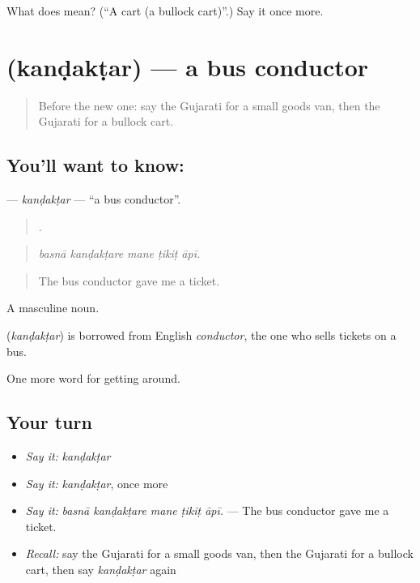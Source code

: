 \begin{tcolorbox}[breakable,colback=teal!4,colframe=teal!35!black,title={Before you move on}]
What does  mean? (\textquotedblleft{}A cart (a bullock cart)\textquotedblright{}.) Say it once more.
\end{tcolorbox}
\section[\texorpdfstring{\gu{કંડક્ટર} (kanḍakṭar)}{કંડક્ટર (kanḍakṭar)}]{ (kanḍakṭar) — a bus conductor}

\label{lesson:GU-C402-kandaktar}



\begin{quote}
Before the new one: say the Gujarati for a small goods van, then the Gujarati for a bullock cart.
\end{quote}

\subsection*{You'll want to know: }
\textbf{} — \emph{kanḍakṭar} — \textquotedblleft{}a bus conductor\textquotedblright{}.

\begin{quote}
    .
\end{quote}

\begin{quote}
\emph{basnā kanḍakṭare mane ṭikiṭ āpī.}
\end{quote}

\begin{quote}
The bus conductor gave me a ticket.
\end{quote}

A masculine noun.

\begin{cousinweb}
\textbf{} (\emph{kanḍakṭar}) is borrowed from English \emph{conductor}, the one who sells tickets on a bus.
\end{cousinweb}

\begin{grammarlens}[title={What you've built}]
One more word for getting around.
\end{grammarlens}

\subsection*{Your turn}
\begin{itemize}
\raggedright
  \item \emph{Say it:} \emph{kanḍakṭar}
  \item \emph{Say it:} \emph{kanḍakṭar}, once more
  \item \emph{Say it:} \emph{basnā kanḍakṭare mane ṭikiṭ āpī.} — The bus conductor gave me a ticket.
  \item \emph{Recall:} say the Gujarati for a small goods van, then the Gujarati for a bullock cart, then say \emph{kanḍakṭar} again
\end{itemize}

